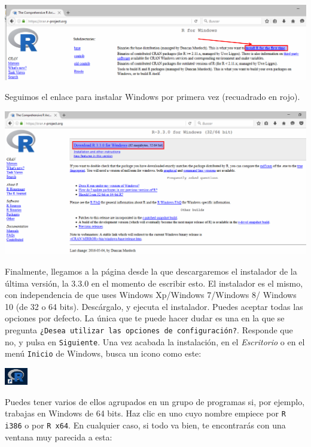 \documentclass[10pt,a4paper]{article}\usepackage[]{graphicx}\usepackage[]{color}
\newcounter {cont01}
\begin{document}
    \begin{center}
    \includegraphics[width=15cm]{../fig/Tut00-36.png}
    \end{center}
 Seguimos el enlace para instalar Windows por primera vez (recuadrado en rojo).
    \begin{center}
    \includegraphics[width=15cm]{../fig/Tut00-37.png}
    \end{center}
Finalmente, llegamos a la página desde la que descargaremos el instalador de la última versión, la
3.3.0 en el momento de escribir esto. El instalador es el
mismo, con independencia de que uses Windows Xp/Windows 7/Windows 8/ Windows 10 (de 32 o 64 bits). 
Descárgalo, y ejecuta el instalador. Puedes aceptar todas las opciones por defecto. La única que te
puede hacer dudar es una en la que se pregunta {\tt ¿Desea utilizar las opciones de
configuración?}. Responde que no, y pulsa en {\tt Siguiente}. Una vez acabada la instalación, en el
{\em Escritorio} o en el menú {\tt Inicio} de Windows, busca un icono como este:
    \begin{center}
    \includegraphics[width=1cm]{../fig/Tut00-38.png}
    \end{center}
Puedes tener varios de ellos agrupados en un grupo de programas si, por ejemplo, trabajas en Windows de
64 bits. Haz clic en uno cuyo nombre empiece por {\tt R i386} o por {\tt R x64}. En cualquier caso,
si todo va bien, te encontrarás con una ventana muy parecida a esta:
\end{document}
